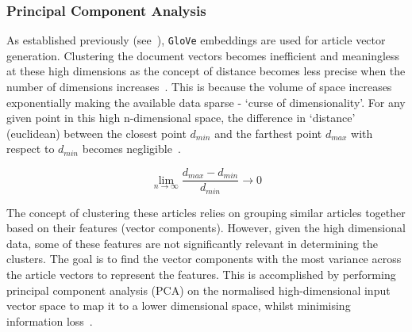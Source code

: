 \subsubsection{Principal Component Analysis}

As established previously (see~), \texttt{GloVe} embeddings are used for article vector generation. Clustering the document vectors becomes inefficient and meaningless at these high dimensions as the concept of distance becomes less precise when the number of dimensions increases~\cite{pca_clustering}. This is because the volume of space increases exponentially making the available data sparse - `curse of dimensionality'. For any given point in this high n-dimensional space, the difference in `distance' (euclidean) between the closest point $d_{min}$ and the farthest point $d_{max}$ with respect to $d_{min}$ becomes negligible~\cite{nearest_neighbour}. 

\[ \lim_{n\to\infty} \frac{d_{max} - d_{min}}{d_{min}} \to0\]

The concept of clustering these articles relies on grouping similar articles together based on their features (vector components). However, given the high dimensional data, some of these features are not significantly relevant in determining the clusters. The goal is to find the vector components with the most variance across the article vectors to represent the features. This is accomplished by performing principal component analysis (PCA) on the normalised high-dimensional input vector space to map it to a lower dimensional space, whilst minimising information loss~\cite{pca_clustering}.

